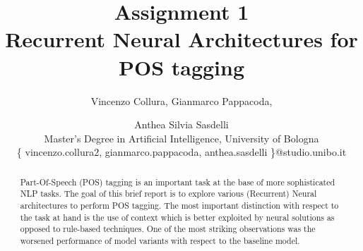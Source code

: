 \documentclass[11pt]{article}
\begin{document}
%
\title{Assignment 1\\
Recurrent Neural Architectures for POS tagging
}
\large {}

\author{
Vincenzo Collura,
Gianmarco Pappacoda,
\and
Anthea Silvia Sasdelli\\
Master's Degree in Artificial Intelligence, University of Bologna\\
\{ vincenzo.collura2, gianmarco.pappacoda, anthea.sasdelli \}@studio.unibo.it
}
\maketitle



\begin{abstract}


\large Part-Of-Speech (POS) tagging is an important task at the base of more sophisticated NLP tasks. The goal of this brief report is to explore various (Recurrent) Neural architectures to perform POS tagging. The most important distinction with respect to the task at hand is the use of context which is better exploited by neural solutions as opposed to rule-based techniques. One of the most striking observations was the worsened performance of model variants with respect to the baseline model.  \\


\end{abstract}
\end{document}
